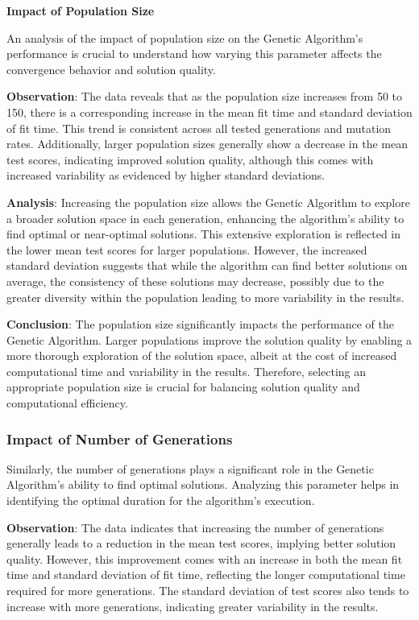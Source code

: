 \documentclass[
]{article}
\begin{document}
    \textbf{Impact of Population Size}

    An analysis of the impact of population size on the Genetic Algorithm’s performance is crucial to understand how varying this parameter affects the convergence behavior and solution quality.

    \textbf{Observation}: The data reveals that as the population size increases from 50 to 150, there is a corresponding increase in the mean fit time and standard deviation of fit time. This trend is consistent across all tested generations and mutation rates. Additionally, larger population sizes generally show a decrease in the mean test scores, indicating improved solution quality, although this comes with increased variability as evidenced by higher standard deviations.

    \textbf{Analysis}: Increasing the population size allows the Genetic Algorithm to explore a broader solution space in each generation, enhancing the algorithm's ability to find optimal or near-optimal solutions. This extensive exploration is reflected in the lower mean test scores for larger populations. However, the increased standard deviation suggests that while the algorithm can find better solutions on average, the consistency of these solutions may decrease, possibly due to the greater diversity within the population leading to more variability in the results.

    \textbf{Conclusion}: The population size significantly impacts the performance of the Genetic Algorithm. Larger populations improve the solution quality by enabling a more thorough exploration of the solution space, albeit at the cost of increased computational time and variability in the results. Therefore, selecting an appropriate population size is crucial for balancing solution quality and computational efficiency.

    \subsubsection{Impact of Number of Generations}

    Similarly, the number of generations plays a significant role in the Genetic Algorithm’s ability to find optimal solutions. Analyzing this parameter helps in identifying the optimal duration for the algorithm’s execution.

    \textbf{Observation}: The data indicates that increasing the number of generations generally leads to a reduction in the mean test scores, implying better solution quality. However, this improvement comes with an increase in both the mean fit time and standard deviation of fit time, reflecting the longer computational time required for more generations. The standard deviation of test scores also tends to increase with more generations, indicating greater variability in the results.
\end{document}
